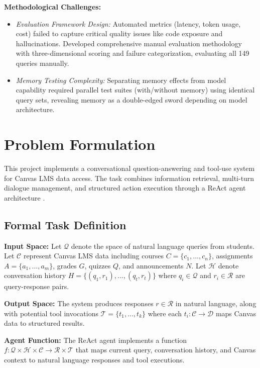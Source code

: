 \documentclass{article}
\begin{document}
\textbf{Methodological Challenges:}
\begin{itemize}
    \item \textit{Evaluation Framework Design:} Automated metrics (latency, token usage, cost) failed to capture critical quality issues like code exposure and hallucinations. Developed comprehensive manual evaluation methodology with three-dimensional scoring and failure categorization, evaluating all 149 queries manually.
    \item \textit{Memory Testing Complexity:} Separating memory effects from model capability required parallel test suites (with/without memory) using identical query sets, revealing memory as a double-edged sword depending on model architecture.
\end{itemize}

\section{Problem Formulation}

This project implements a conversational question-answering and tool-use system \cite{chen2024llmma} for Canvas LMS data access. The task combines information retrieval, multi-turn dialogue management, and structured action execution through a ReAct agent architecture \cite{yao2023react}.

\subsection{Formal Task Definition}

\textbf{Input Space:} Let $\mathcal{Q}$ denote the space of natural language queries from students. Let $\mathcal{C}$ represent Canvas LMS data including courses $C = \{c_1, ..., c_n\}$, assignments $A = \{a_1, ..., a_m\}$, grades $G$, quizzes $Q$, and announcements $N$. Let $\mathcal{H}$ denote conversation history $H = \{(q_1, r_1), ..., (q_t, r_t)\}$ where $q_i \in \mathcal{Q}$ and $r_i \in \mathcal{R}$ are query-response pairs.

\textbf{Output Space:} The system produces responses $r \in \mathcal{R}$ in natural language, along with potential tool invocations $\mathcal{T} = \{t_1, ..., t_k\}$ where each $t_i: \mathcal{C} \rightarrow \mathcal{D}$ maps Canvas data to structured results.

\textbf{Agent Function:} The ReAct agent implements a function $f: \mathcal{Q} \times \mathcal{H} \times \mathcal{C} \rightarrow \mathcal{R} \times \mathcal{T}$ that maps current query, conversation history, and Canvas context to natural language responses and tool executions.
\end{document}
